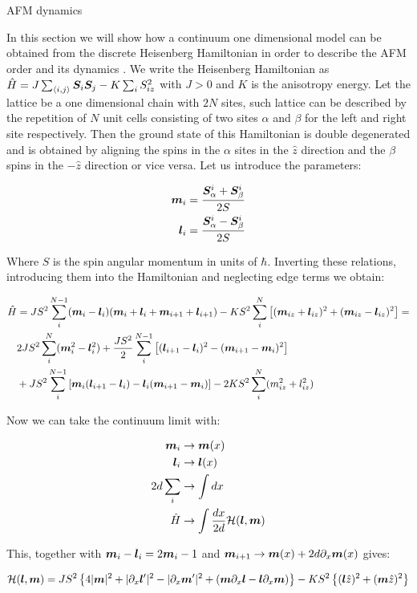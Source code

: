 \begin{section}{AFM dynamics}

In this section we will show how a continuum one dimensional model can be obtained from the discrete Heisenberg Hamiltonian in order to describe the AFM order and its dynamics \cite{Tveten2016}. We write the Heisenberg Hamiltonian as $\hat{H} = J \sum_{\langle i,j \rangle} \boldsymbol{S}_i\boldsymbol{S}_j - K \sum_i S_{iz}^2$ with $J>0$ and $K$ is the anisotropy energy. Let the lattice be a one dimensional chain with $2N$ sites, such lattice can be described by the repetition of $N$ unit cells consisting of two sites $\alpha$ and $\beta$ for the left and right site respectively. Then the ground state of this Hamiltonian is double degenerated and is obtained by aligning the spins in the $\alpha$ sites in the $\hat{z}$ direction and the $\beta$ spins in the $-\hat{z}$ direction or vice versa. Let us introduce the parameters:

\begin{align}
\boldsymbol{m}_i &= \frac{\boldsymbol{S}_{\alpha}^i + \boldsymbol{S}_{\beta}^i}{2S} \\
\boldsymbol{l}_i &= \frac{\boldsymbol{S}_{\alpha}^i - \boldsymbol{S}_{\beta}^i}{2S}
\end{align}

Where $S$ is the spin angular momentum in units of $\hbar$. Inverting these relations, introducing them into the Hamiltonian and neglecting edge terms we obtain:

\begin{align}
\hat{H} &= JS^2 \sum_i^{N-1} (\boldsymbol{m}_i-\boldsymbol{l}_i)(\boldsymbol{m}_i+\boldsymbol{l}_i+\boldsymbol{m}_{i+1}+\boldsymbol{l}_{i+1}) - KS^2\sum_i^N \left[(\boldsymbol{m}_{iz}+\boldsymbol{l}_{iz})^2 + (\boldsymbol{m}_{iz}-\boldsymbol{l}_{iz})^2 \right] \nonumber = \\
& 2JS^2\sum_i^{N} (\boldsymbol{m}_i^2-\boldsymbol{l}_i^2)+\frac{JS^2}{2}\sum_i^{N-1}\left[(\boldsymbol{l}_{i+1}-\boldsymbol{l}_i)^2-(\boldsymbol{m}_{i+1}-\boldsymbol{m}_i)^2 \right] \nonumber \\
& + JS^2\sum_i^{N-1} \left[ \boldsymbol{m}_i(\boldsymbol{l}_{i+1}-\boldsymbol{l}_i) - \boldsymbol{l}_i(\boldsymbol{m}_{i+1}-\boldsymbol{m}_i) \right] - 2KS^2\sum_i^N(m_{iz}^2+l_{iz}^2)
\end{align}

Now we can take the continuum limit with:

\begin{align*}
\boldsymbol{m}_i &\rightarrow \boldsymbol{m}(x) \\
\boldsymbol{l}_i &\rightarrow \boldsymbol{l}(x) \\
2d \sum_i &\rightarrow \int dx \\
\hat{H} &\rightarrow \int \frac{dx}{2d} \mathcal{H}(\boldsymbol{l},\boldsymbol{m})
\end{align*}

This, together with $\boldsymbol{m}_i-\boldsymbol{l}_i = 2\boldsymbol{m}_i-1$ and $\boldsymbol{m}_{i+1} \rightarrow \boldsymbol{m}(x) + 2d \partial_x\boldsymbol{m}(x)$ gives:

\begin{equation}
\mathcal{H}(\boldsymbol{l},\boldsymbol{m}) = JS^2\left\{ 4|\boldsymbol{m}|^2 + |\partial_x\boldsymbol{l}'|^2 -  |\partial_x\boldsymbol{m}'|^2 +(\boldsymbol{m}\partial_x\boldsymbol{l} -\boldsymbol{l}\partial_x\boldsymbol{m}) \right\} -KS^2\left\{ (\boldsymbol{l}\hat{z})^2 + (\boldsymbol{m}\hat{z})^2 \right\}
\end{equation}

\end{section}

